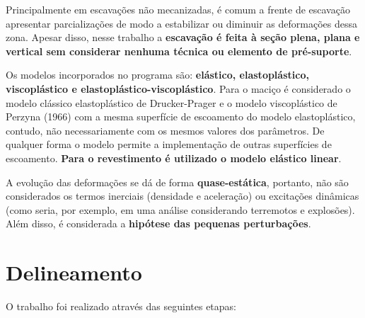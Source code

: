 Principalmente em escavações não mecanizadas, é comum a frente de escavação apresentar parcializações de modo a estabilizar ou diminuir as deformações dessa zona. Apesar disso, nesse trabalho a \textbf{escavação é feita à seção plena, plana e vertical sem considerar nenhuma técnica ou elemento de pré-suporte}.

Os modelos incorporados no programa são: \textbf{elástico, elastoplástico, viscoplástico e elastoplástico-viscoplástico}. Para o maciço é considerado o modelo clássico elastoplástico de Drucker-Prager e o modelo viscoplástico de Perzyna (1966) com a mesma superfície de escoamento do modelo elastoplástico, contudo, não necessariamente com os mesmos valores dos parâmetros. De qualquer forma o modelo permite a implementação de outras superfícies de escoamento. \textbf{Para o revestimento é utilizado o modelo elástico linear}.

A evolução das deformações se dá de forma \textbf{quase-estática}, portanto, não são considerados os termos inerciais (densidade e aceleração) ou excitações dinâmicas (como seria, por exemplo, em uma análise considerando terremotos e explosões). Além disso, é considerada a \textbf{hipótese das pequenas perturbações}.

\section{Delineamento}

O trabalho foi realizado através das seguintes etapas:

